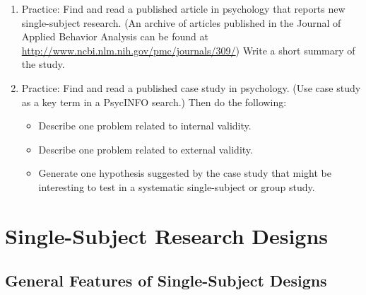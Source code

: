 \begin{fullwidth}

\begin{enumerate}

\item  Practice: Find and read a published article in psychology that reports new single-subject
research. (An archive of articles published in the Journal of Applied Behavior Analysis can be found at \url{http://www.ncbi.nlm.nih.gov/pmc/journals/309/}) Write a short summary of the study.


\item Practice: Find and read a published case study in psychology. (Use case study as a key term in a PsycINFO search.) Then do the following:

\begin{itemize}
\item Describe one problem related to internal validity.
\item Describe one problem related to external validity.
\item Generate one hypothesis suggested by the case study that might be interesting to test in a
systematic single-subject or group study.
\end{itemize}


\end{enumerate}

\end{fullwidth}  

\newpage
\section{Single-Subject Research Designs}


\subsection{General Features of Single-Subject Designs}

